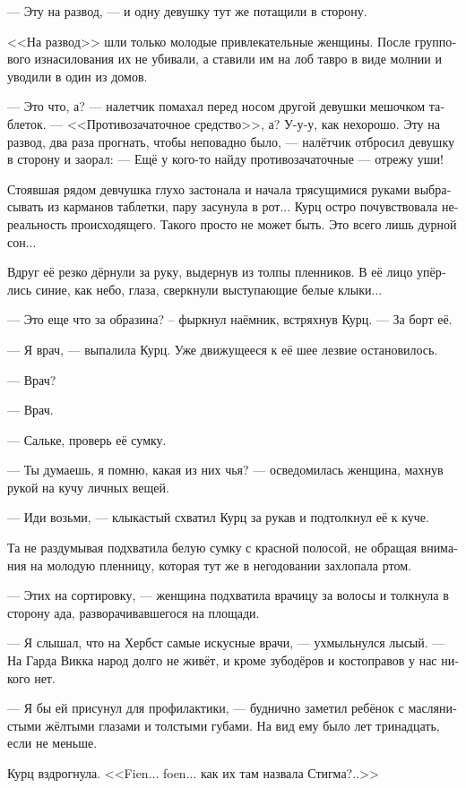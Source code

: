 \documentclass[a4paper,12pt,fleqn]{book}\usepackage{cooltooltips}\usepackage{polyglossia}\setdefaultlanguage[babelshorthands=true]{russian}\setotherlanguage{english}\defaultfontfeatures{Ligatures=TeX,Mapping=tex-text} \usepackage{xcolor}\definecolor{lightgray}{HTML}{bbbbbb}\color{lightgray}\newcommand{\ml}[3]{\textenglish{\textcolor{black}{#3}}}
\begin{document}
--- Эту на развод, --- и одну девушку тут же потащили в сторону.

<<На развод>> шли только молодые привлекательные женщины.
После группового изнасилования их не убивали, а ставили им на лоб тавро в виде молнии и уводили в один из домов.

--- Это что, а? --- налетчик помахал перед носом другой девушки мешочком таблеток.
--- <<Противозачаточное средство>>, а?
У-у-у, как нехорошо.
Эту на развод, два раза прогнать, чтобы неповадно было, --- налётчик отбросил девушку в сторону и заорал:
--- Ещё у кого-то найду противозачаточные --- отрежу уши!

Стоявшая рядом девчушка глухо застонала и начала трясущимися руками выбрасывать из карманов таблетки, пару засунула в рот...
Курц остро почувствовала нереальность происходящего.
Такого просто не может быть.
Это всего лишь дурной сон...

Вдруг её резко дёрнули за руку, выдернув из толпы пленников.
В её лицо упёрлись синие, как небо, глаза, сверкнули выступающие белые клыки...

--- Это еще что за образина? -- фыркнул наёмник, встряхнув Курц.
--- За борт её.

--- Я врач, --- выпалила Курц.
Уже движущееся к её шее лезвие остановилось.

--- Врач?

--- Врач.

--- Сальке, проверь её сумку.

--- Ты думаешь, я помню, какая из них чья? --- осведомилась женщина, махнув рукой на кучу личных вещей.

--- Иди возьми, --- клыкастый схватил Курц за рукав и подтолкнул её к куче.

Та не раздумывая подхватила белую сумку с красной полосой, не обращая внимания на молодую пленницу, которая тут же в негодовании захлопала ртом.

--- Этих на сортировку, --- женщина подхватила врачицу за волосы и толкнула в сторону ада, разворачивавшегося на площади.

--- Я слышал, что на Хербст самые искусные врачи, --- ухмыльнулся лысый.
--- На Гарда Викка народ долго не живёт, и кроме зубодёров и костоправов у нас никого нет.

--- Я бы ей присунул для профилактики, --- буднично заметил ребёнок с маслянистыми жёлтыми глазами и толстыми губами.
На вид ему было лет тринадцать, если не меньше.

Курц вздрогнула.
<<Fien... foen... как их там назвала Стигма?..>>
\end{document}
